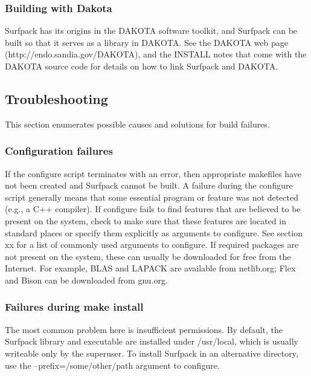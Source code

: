 \documentclass{article}
\begin{document}
\subsubsection{Building with Dakota}
Surfpack has its origins in the DAKOTA software toolkit, and Surfpack can be built so that it serves as a library in DAKOTA. See the DAKOTA web page (http://endo.sandia.gov/DAKOTA), and the INSTALL notes that come with the DAKOTA source code for details on how to link Surfpack and DAKOTA.

%
%

\subsection{Troubleshooting}
This section enumerates possible causes and solutions for build failures.
\subsubsection{Configuration failures}
If the configure script terminates with an error, then appropriate makefiles have not been created and Surfpack cannot be built.  A failure during the configure script generally means that some essential program or feature was not detected (e.g., a C++ compiler). If configure fails to find features that are believed to be present on the system, check to make sure that these features are located in standard places or specify them explicitly as arguments to configure.  See section xx for a list of commonly used arguments to configure.  If required packages are not present on the system, these can usually be downloaded for free from the Internet.  For example, BLAS and LAPACK are available from netlib.org; Flex and Bison can be downloaded from gnu.org.
\subsubsection{Failures during make install}
The most common problem here is insufficient permissions.  By default, the Surfpack library and executable are installed under /usr/local, which is usually writeable only by the superuser.  To install Surfpack in an alternative directory, use the --prefix=/some/other/path argument to configure.
\end{document}

